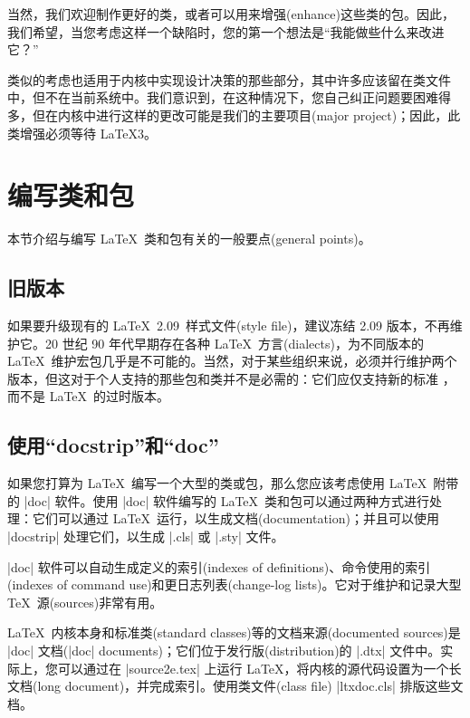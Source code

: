 \documentclass{ltxguide}[1995/11/28]
\begin{document}
当然，我们欢迎制作更好的类，或者可以用来增强(enhance)这些类的包。因此，我们希望，当您考虑这样一个缺陷时，您的第一个想法是“我能做些什么来改进它？”

类似的考虑也适用于内核中实现设计决策的那些部分，其中许多应该留在类文件中，但不在当前系统中。我们意识到，在这种情况下，您自己纠正问题要困难得多，但在内核中进行这样的更改可能是我们的主要项目(major project)；因此，此类增强必须等待 \LaTeX3。

\newpage


\section{\heiti 编写类和包}
\label{Sec:writing}

本节介绍与编写 \LaTeX{}\ 类和包有关的一般要点(general points)。


\subsection[旧版本]{\heiti 旧版本}

如果要升级现有的 \LaTeX~2.09\ 样式文件(style file)，建议冻结 2.09 版本，不再维护它。20 世纪 90 年代早期存在各种 \LaTeX{}\ 方言(dialects)，为不同版本的 \LaTeX{}\ 维护宏包几乎是不可能的。当然，对于某些组织来说，必须并行维护两个版本，但这对于个人支持的那些包和类并不是必需的：它们应仅支持新的标准 \LaTeXe{}，而不是 \LaTeX{}\ 的过时版本。


\subsection[使用“docstrip”和“doc”]{\heiti 使用“docstrip”和“doc”}

如果您打算为 \LaTeX{}\ 编写一个大型的类或包，那么您应该考虑使用 \LaTeX{}\ 附带的 |doc| 软件。使用 |doc| 软件编写的 \LaTeX{}\ 类和包可以通过两种方式进行处理：它们可以通过 \LaTeX{}\ 运行，以生成文档(documentation)；并且可以使用 |docstrip| 处理它们，以生成 |.cls| 或 |.sty| 文件。

|doc| 软件可以自动生成定义的索引(indexes of definitions)、命令使用的索引(indexes of command use)和更日志列表(change-log lists)。它对于维护和记录大型 \TeX{}\ 源(sources)非常有用。

\LaTeX{}\ 内核本身和标准类(standard classes)等的文档来源(documented sources)是 |doc| 文档(|doc| documents)；它们位于发行版(distribution)的 |.dtx| 文件中。实际上，您可以通过在 |source2e.tex| 上运行 \LaTeX{}，将内核的源代码设置为一个长文档(long document)，并完成索引。使用类文件(class file) |ltxdoc.cls| 排版这些文档。
\end{document}
